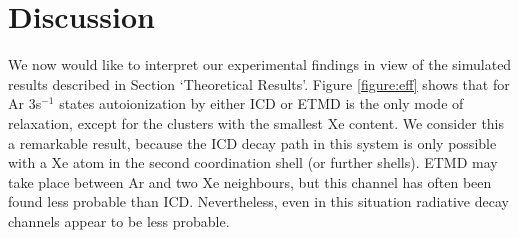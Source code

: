 \section{Discussion
\label{sec:discussion}}
%
%
%
%
%
%
We now would like to interpret our experimental findings in view of the simulated results described in Section `Theoretical Results'.
Figure \ref{figure:eff} shows that for Ar 3s$^{-1}$ states autoionization by either ICD or ETMD is the only mode of relaxation, except for the clusters with the smallest Xe content.
We consider this a remarkable result, because the ICD decay path in this system is only possible with a Xe atom in the second coordination shell (or further shells).
ETMD may take place between Ar and two Xe neighbours, but this channel has often been found less probable than ICD.\cite{zobeley}
Nevertheless, even in this situation radiative decay channels appear to be less probable.


